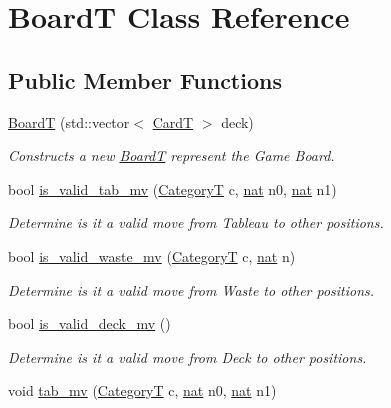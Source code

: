 \hypertarget{class_board_t}{}\section{BoardT Class Reference}
\label{class_board_t}
\subsection*{Public Member Functions}
\begin{DoxyCompactItemize}
\item 
\hyperlink{class_board_t_a4a25fcb5e2e968e11d50bf6c1bb763a1}{BoardT} (std\+::vector$<$ \hyperlink{struct_card_t}{CardT} $>$ deck)
\begin{DoxyCompactList}\small\item\em Constructs a new \hyperlink{class_board_t}{BoardT} represent the Game Board. \end{DoxyCompactList}\item 
bool \hyperlink{class_board_t_aeeb18d1b2d9889a9a560777794f58b50}{is\+\_\+valid\+\_\+tab\+\_\+mv} (\hyperlink{_card_types_8h_aa77f81f8d4c8aa57046a50ca32d6b7b4}{CategoryT} c, \hyperlink{_card_types_8h_a56638ee9d162e8cce3a15f92d2023d6e}{nat} n0, \hyperlink{_card_types_8h_a56638ee9d162e8cce3a15f92d2023d6e}{nat} n1)
\begin{DoxyCompactList}\small\item\em Determine is it a valid move from Tableau to other positions. \end{DoxyCompactList}\item 
bool \hyperlink{class_board_t_aa51775d072b3f91855b9f13c82461fb2}{is\+\_\+valid\+\_\+waste\+\_\+mv} (\hyperlink{_card_types_8h_aa77f81f8d4c8aa57046a50ca32d6b7b4}{CategoryT} c, \hyperlink{_card_types_8h_a56638ee9d162e8cce3a15f92d2023d6e}{nat} n)
\begin{DoxyCompactList}\small\item\em Determine is it a valid move from Waste to other positions. \end{DoxyCompactList}\item 
bool \hyperlink{class_board_t_affe6cfc5c246bcfa0afd59476c70db8c}{is\+\_\+valid\+\_\+deck\+\_\+mv} ()
\begin{DoxyCompactList}\small\item\em Determine is it a valid move from Deck to other positions. \end{DoxyCompactList}\item 
void \hyperlink{class_board_t_a812f5c08de1db6cc2f2e102d2cf64980}{tab\+\_\+mv} (\hyperlink{_card_types_8h_aa77f81f8d4c8aa57046a50ca32d6b7b4}{CategoryT} c, \hyperlink{_card_types_8h_a56638ee9d162e8cce3a15f92d2023d6e}{nat} n0, \hyperlink{_card_types_8h_a56638ee9d162e8cce3a15f92d2023d6e}{nat} n1)

\end{DoxyCompactItemize}
